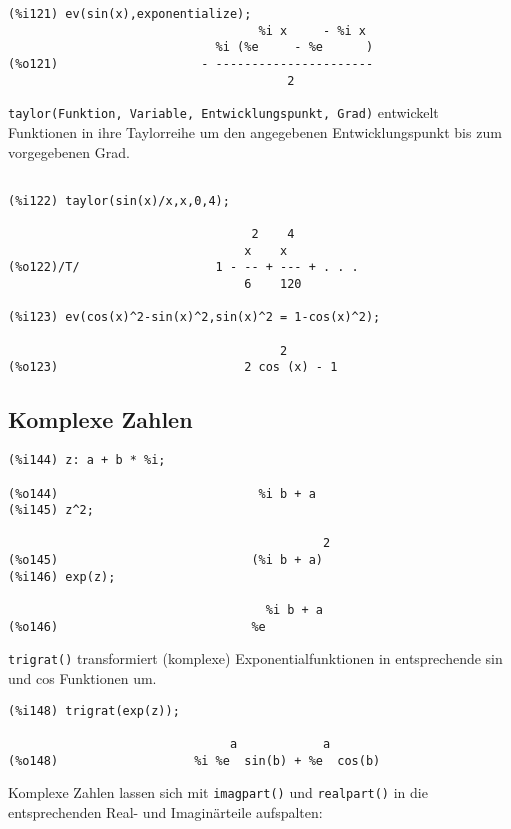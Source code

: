 \documentclass[12pt]{scrartcl}
\begin{document}
\begin{verbatim}
(%i121) ev(sin(x),exponentialize);
                                   %i x     - %i x
                             %i (%e     - %e      )
(%o121)                    - ----------------------
                                       2
\end{verbatim}

\texttt{taylor(Funktion, Variable, Entwicklungspunkt, Grad)}
entwickelt Funktionen in ihre Taylorreihe um den angegebenen
Entwicklungspunkt bis zum vorgegebenen Grad.

\begin{verbatim}

(%i122) taylor(sin(x)/x,x,0,4);

                                  2    4
                                 x    x
(%o122)/T/                   1 - -- + --- + . . .
                                 6    120

(%i123) ev(cos(x)^2-sin(x)^2,sin(x)^2 = 1-cos(x)^2);

                                      2
(%o123)                          2 cos (x) - 1

\end{verbatim}

\subsection{Komplexe Zahlen}

\begin{verbatim}
(%i144) z: a + b * %i;

(%o144)                            %i b + a
(%i145) z^2;

                                            2
(%o145)                           (%i b + a)
(%i146) exp(z);

                                    %i b + a
(%o146)                           %e
\end{verbatim}

\texttt{trigrat()} transformiert (komplexe) Exponentialfunktionen in
entsprechende sin und cos Funktionen um.

\begin{verbatim}
(%i148) trigrat(exp(z));

                               a            a
(%o148)                   %i %e  sin(b) + %e  cos(b)
\end{verbatim}

Komplexe Zahlen lassen sich mit \texttt{imagpart()} und
\texttt{realpart()} in die entsprechenden Real- und Imaginärteile
aufspalten:
\end{document}
